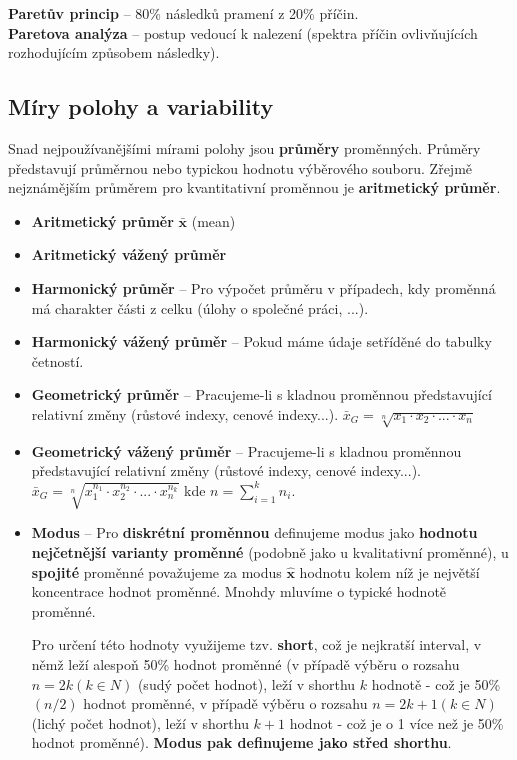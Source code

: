 \textbf{Paretův princip} – 80\% následků pramení z 20\% příčin.\\
\textbf{Paretova analýza} – postup vedoucí k nalezení  (spektra příčin ovlivňujících rozhodujícím způsobem následky).

\subsection{Míry polohy a variability}
Snad nejpoužívanějšími mírami polohy jsou \textbf{průměry} proměnných. Průměry představují průměrnou nebo typickou hodnotu výběrového souboru. Zřejmě nejznámějším průměrem pro kvantitativní proměnnou je \textbf{aritmetický průměr}.
\begin{itemize}
	\item \textbf{Aritmetický průměr} $\mathbf{\bar{x}}$ (mean)
	\item \textbf{Aritmetický vážený průměr}
	\item \textbf{Harmonický průměr}  -- Pro výpočet průměru v případech, kdy proměnná má charakter části z celku (úlohy o společné práci, ...).
	\item \textbf{Harmonický vážený průměr} -- Pokud máme údaje setříděné do tabulky četností.
	\item \textbf{Geometrický průměr} -- Pracujeme-li s kladnou proměnnou představující relativní změny (růstové indexy, cenové indexy...). $\bar{x}_G = \sqrt[n]{x_1 \cdot x_2 \cdot ... \cdot x_n}$
	\item \textbf{Geometrický vážený průměr} -- Pracujeme-li s kladnou proměnnou představující relativní změny (růstové indexy, cenové indexy...). $\bar{x}_G = \sqrt[n]{x_1^{n_1} \cdot x_2^{n_2} \cdot ... \cdot x_n^{n_k}}$ kde $n = \sum\limits_{i=1}^k n_i$. \\

	\item \textbf{Modus} -- Pro \textbf{diskrétní proměnnou} definujeme modus jako \textbf{hodnotu nejčetnější varianty proměnné} (podobně jako u kvalitativní proměnné), u \textbf{spojité} proměnné považujeme za modus $\mathbf{\hat{x}}$ hodnotu kolem níž je největší koncentrace hodnot proměnné. Mnohdy mluvíme o typické hodnotě proměnné.
	
	Pro určení této hodnoty využijeme tzv. \textbf{short}, což je nejkratší interval, v němž leží alespoň 50\% hodnot proměnné (v případě výběru o rozsahu $n = 2k(k \in N)$ (sudý počet hodnot), leží v shorthu $k$ hodnotě - což je 50\% $(n/2)$ hodnot proměnné, v případě výběru o rozsahu $n = 2k + 1(k \in N)$ (lichý počet hodnot), leží v shorthu $k + 1$ hodnot - což je o 1 více než je 50\% hodnot proměnné). \textbf{Modus pak definujeme jako střed shorthu}.


\end{itemize}

